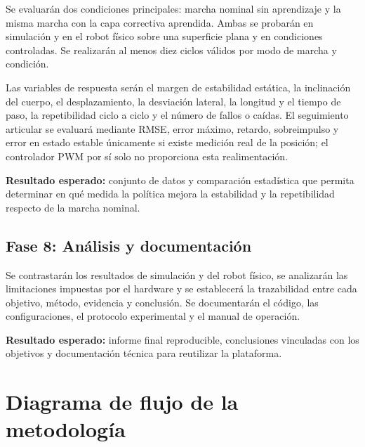 Se evaluarán dos condiciones principales: marcha nominal sin aprendizaje y la
misma marcha con la capa correctiva aprendida. Ambas se probarán en simulación y
en el robot físico sobre una superficie plana y en condiciones controladas. Se
realizarán al menos diez ciclos válidos por modo de marcha y condición.

Las variables de respuesta serán el margen de estabilidad estática, la
inclinación del cuerpo, el desplazamiento, la desviación lateral, la longitud y
el tiempo de paso, la repetibilidad ciclo a ciclo y el número de fallos o
caídas. El seguimiento articular se evaluará mediante RMSE, error máximo,
retardo, sobreimpulso y error en estado estable únicamente si existe medición
real de la posición; el controlador PWM por sí solo no proporciona esta
realimentación.

\textbf{Resultado esperado:} conjunto de datos y comparación estadística que
permita determinar en qué medida la política mejora la estabilidad y la
repetibilidad respecto de la marcha nominal.

\subsection{Fase 8: Análisis y documentación}

Se contrastarán los resultados de simulación y del robot físico, se analizarán
las limitaciones impuestas por el hardware y se establecerá la trazabilidad
entre cada objetivo, método, evidencia y conclusión. Se documentarán el código,
las configuraciones, el protocolo experimental y el manual de operación.

\textbf{Resultado esperado:} informe final reproducible, conclusiones
vinculadas con los objetivos y documentación técnica para reutilizar la
plataforma.

\section{Diagrama de flujo de la metodología}

